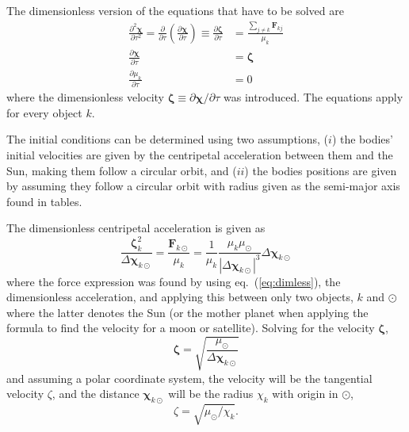 \documentclass[a4paper,11pt]{article}
\begin{document}
The dimensionless version of the equations that have to be solved are
\begin{subequations}
    \begin{align}
        \frac{\partial^2 \boldsymbol{\chi}}{\partial \tau^2} = \frac{\partial}{\partial \tau} \left( \frac{\partial \boldsymbol{\chi}}{\partial \tau} \right) \equiv \frac{\partial \boldsymbol{\zeta}}{\partial \tau}  &= \frac{\sum_{j\neq k} \mathbf{F}_{kj}}{\mu_k} \\
        \frac{\partial \boldsymbol{\chi}}{\partial \tau} &= \boldsymbol{\zeta} \\
        \frac{\partial \mu_k}{\partial \tau} &= 0
    \end{align}
    \label{eq:functions}
\end{subequations}
where the dimensionless velocity $\boldsymbol{\zeta} \equiv \partial \boldsymbol{\chi}/\partial \tau$ was introduced. The equations apply for every object $k$.

The initial conditions can be determined using two assumptions, ($i$) the bodies' initial velocities are given by the centripetal acceleration between them and the Sun, making them follow a circular orbit, and ($ii$) the bodies positions are given by assuming they follow a circular orbit with radius given as the semi-major axis found in tables. 

The dimensionless centripetal acceleration is given as 
\begin{equation}
    \frac{\boldsymbol{\zeta}_k^2}{\Delta \boldsymbol{\chi}_{k\odot}} = \frac{\mathbf{F}_{k\odot}}{\mu_k} = \frac{1}{\mu_k} \frac{\mu_k \mu_\odot}{|\Delta \boldsymbol{\chi}_{k\odot}|^3} \Delta \boldsymbol{\chi}_{k\odot}
    \label{eq:centracc}
\end{equation}
where the force expression was found by using eq.~(\ref{eq:dimless}), the dimensionless acceleration, and applying this between only two objects, $k$ and $\odot$ where the latter denotes the Sun (or the mother planet when applying the formula to find the velocity for a moon or satellite). Solving for the velocity $\boldsymbol{\zeta}$,
\[
    \boldsymbol{\zeta} = \sqrt{\frac{\mu_\odot}{\Delta \boldsymbol{\chi}_{k\odot}}}
\]
and assuming a polar coordinate system, the velocity will be the tangential velocity $\zeta$, and the distance $\boldsymbol{\chi}_{k\odot}$ will be the radius $\chi_{k}$ with origin in $\odot$,
\begin{equation}
    \zeta = \sqrt{\mu_\odot/ \chi_{k}}.
    \label{eq:centracc_used}
\end{equation}
\end{document}
